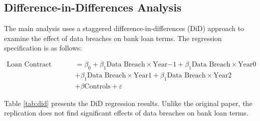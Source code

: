 \documentclass[11pt]{article}
\begin{document}
\subsection{Difference-in-Differences Analysis}
The main analysis uses a staggered difference-in-differences (DiD) approach to examine the effect of data breaches on bank loan terms. The regression specification is as follows:

\begin{align*}
  \text{Loan Contract Terms} & = \beta_0 + \beta_1\text{Data Breach} \times \text{Year}{-1} + \beta_1\text{Data Breach} \times \text{Year}{0} \\
                             & + \beta_1\text{Data Breach} \times \text{Year}{1} + \beta_1\text{Data Breach} \times \text{Year}{2}            \\
                             & + \beta \text{Controls} + \varepsilon
\end{align*}

Table \ref{tab:did} presents the DiD regression results. Unlike the original paper, the replication does not find significant effects of data breaches on bank loan terms.
\end{document}
